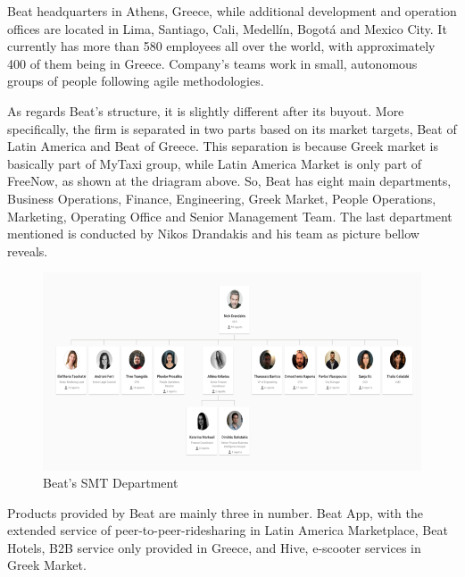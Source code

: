 Beat headquarters in Athens, Greece, while additional development and operation offices are located in Lima, Santiago, Cali, Medellín, Bogotá and Mexico City. It currently has more than 580 employees all over the world, with approximately 400 of them being in Greece. Company's teams work in small, autonomous groups of people following agile methodologies. \par
As regards Beat's structure, it is slightly different after its buyout. More specifically, the firm is separated in two parts based on its market targets, Beat of Latin America and Beat of Greece. This separation is because Greek market is basically part of MyTaxi group, while Latin America Market is only part of FreeNow, as shown at the driagram above. So, Beat has eight main departments, Business Operations, Finance, Engineering, Greek Market, People Operations, Marketing, Operating Office and Senior Management Team. The last department mentioned is conducted by Nikos Drandakis and his team as picture bellow reveals.\par
\begin{figure}[h!]
	\begin{center}
		\includegraphics[scale=0.7]{images/organization.png}
	\end{center}
	\caption{Beat's SMT Department}
\end{figure}
Products provided by Beat are mainly three in number. Beat App, with the extended service of peer-to-peer-ridesharing in Latin America Marketplace, Beat Hotels, B2B service only provided in Greece, and Hive, e-scooter services in Greek Market.\par

